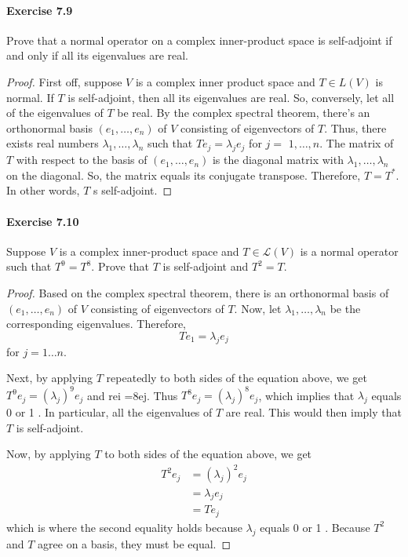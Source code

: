 \documentclass{article}
\theoremstyle{definition}
\begin{document}
\paragraph{Exercise 7.9} Prove that a normal operator on a complex inner-product space is self-adjoint if and only if all its eigenvalues are real.
\begin{proof}
    First off, suppose $V$ is a complex inner product space and $T \in L(V)$ is normal. If $T$ is self-adjoint, then all its eigenvalues are real. So, conversely, let all of the eigenvalues of $T$ be real. By the complex spectral theorem, there's an orthonormal basis $\left(e_1, \ldots, e_n\right)$ of $V$ consisting of eigenvectors of $T$. Thus, there exists real numbers $\lambda_1, \ldots, \lambda_n$ such that $T e_j=\lambda_j e_j$ for $j=$ $1, \ldots, n$.
The matrix of $T$ with respect to the basis of $\left(e_1, \ldots, e_n\right)$ is the diagonal matrix with $\lambda_1, \ldots, \lambda_n$ on the diagonal. So, the matrix equals its conjugate transpose. Therefore, $T=T^*$. In other words, $T$ s self-adjoint.
\end{proof}



\paragraph{Exercise 7.10} Suppose $V$ is a complex inner-product space and $T \in \mathcal{L}(V)$ is a normal operator such that $T^{9}=T^{8}$. Prove that $T$ is self-adjoint and $T^{2}=T$.
\begin{proof}
    Based on the complex spectral theorem, there is an orthonormal basis of $\left(e_1, \ldots, e_n\right)$ of $V$ consisting of eigenvectors of $T$. Now, let $\lambda_1, \ldots, \lambda_n$ be the corresponding eigenvalues. Therefore,
$$
T e_1=\lambda_j e_j
$$
for $j=1 \ldots n$.

Next, by applying $T$ repeatedly to both sides of the equation above, we get $T^9 e_j=\left(\lambda_j\right)^9 e_j$ and rei =8ej. Thus $T^8 e_j=\left(\lambda_j\right)^8 e_j$, which implies that $\lambda_j$ equals 0 or 1 . In particular, all the eigenvalues of $T$ are real. This would then imply that $T$ is self-adjoint.

Now, by applying $T$ to both sides of the equation above, we get
$$
\begin{aligned}
T^2 e_j & =\left(\lambda_j\right)^2 e_j \\
& =\lambda_j e_j \\
& =T e_j
\end{aligned}
$$
which is where the second equality holds because $\lambda_j$ equals 0 or 1 . Because $T^2$ and $T$ agree on a basis, they must be equal.
\end{proof}
\end{document}
